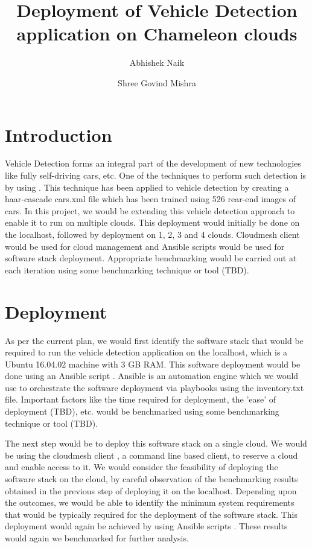 \documentclass[9pt,twocolumn,twoside]{styles/osajnl}
\title{Deployment of Vehicle Detection application on Chameleon clouds}
\author[1]{Abhishek Naik}
\author[2]{Shree Govind Mishra}
\affil[1]{School of Informatics and Computing, Bloomington, IN 47408, U.S.A.}
\affil[2]{School of Informatics and Computing, Bloomington, IN 47408, U.S.A.}
\begin{document}
\maketitle

\section{Introduction}

Vehicle Detection forms an integral part of the development of new
technologies like fully self-driving cars, etc.  One of the techniques
to perform such detection is by using \cite{haar-cascade}.  This
technique has been applied to vehicle detection by creating a
haar-cascade cars.xml file which has been trained using 526 rear-end
images of cars.  In this project, we would be extending this vehicle
detection approach to enable it to run on multiple clouds.  This
deployment would initially be done on the localhost, followed by
deployment on 1, 2, 3 and 4 clouds.  Cloudmesh client would be used
for cloud management and Ansible scripts would be used for software
stack deployment.  Appropriate benchmarking would be carried out at
each iteration using some benchmarking technique or tool (TBD).

\section{Deployment}

As per the current plan, we would first identify the software stack
that would be required to run the vehicle detection application on the
localhost, which is a Ubuntu 16.04.02 machine with 3 GB RAM.  This
software deployment would be done using an Ansible script
\cite{Ansible}.  Ansible is an automation engine which we would use to
orchestrate the software deployment via playbooks using the
inventory.txt file.  Important factors like the time required for
deployment, the 'ease' of deployment (TBD), etc. would be benchmarked
using some benchmarking technique or tool (TBD).

The next step would be to deploy this software stack on a single
cloud.  We would be using the cloudmesh client
\cite{github-cloudmesh-client}, a command line based client, to
reserve a cloud and enable access to it.  We would consider the
feasibility of deploying the software stack on the cloud, by careful
observation of the benchmarking results obtained in the previous step
of deploying it on the localhost.  Depending upon the outcomes, we
would be able to identify the minimum system requirements that would
be typically required for the deployment of the software stack.  This
deployment would again be achieved by using Ansible
scripts \cite{Ansible}.  These results would again we benchmarked for
further analysis.
	
\end{document}
